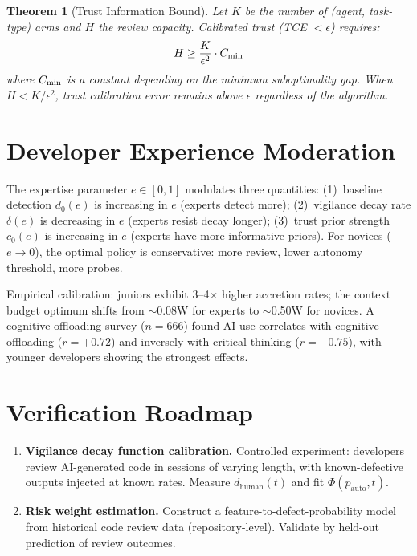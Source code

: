 \documentclass[11pt, a4paper, copyright]{googledeepmind}
\newtheorem{theorem}{Theorem}[section]
\begin{document}
\begin{appendices}
\begin{theorem}[Trust Information Bound]
\label{thm:info-bound}
Let $K$ be the number of (agent, task-type) arms and $H$ the review capacity. Calibrated trust (TCE $< \epsilon$) requires:
\begin{equation}
H \geq \frac{K}{\epsilon^2} \cdot C_{\textup{min}}
\end{equation}
where $C_{\textup{min}}$ is a constant depending on the minimum suboptimality gap. When $H < K/\epsilon^2$, trust calibration error remains above $\epsilon$ regardless of the algorithm.
\end{theorem}

\section{Developer Experience Moderation}
\label{app:expertise}

The expertise parameter $e \in [0,1]$ modulates three quantities: (1)~baseline detection $d_0(e)$ is increasing in $e$ (experts detect more); (2)~vigilance decay rate $\delta(e)$ is decreasing in $e$ (experts resist decay longer); (3)~trust prior strength $c_0(e)$ is increasing in $e$ (experts have more informative priors). For novices ($e \to 0$), the optimal policy is conservative: more review, lower autonomy threshold, more probes.

Empirical calibration: juniors exhibit 3--4$\times$ higher accretion rates; the context budget optimum shifts from $\sim$0.08W for experts to $\sim$0.50W for novices. A cognitive offloading survey ($n = 666$) found AI use correlates with cognitive offloading ($r = +0.72$) and inversely with critical thinking ($r = -0.75$), with younger developers showing the strongest effects.

\section{Verification Roadmap}
\label{app:verification}

\begin{enumerate}[leftmargin=*]
\item \textbf{Vigilance decay function calibration.} Controlled experiment: developers review AI-generated code in sessions of varying length, with known-defective outputs injected at known rates. Measure $d_{\text{human}}(t)$ and fit $\Phi(p_{\text{auto}}, t)$.

\item \textbf{Risk weight estimation.} Construct a feature-to-defect-probability model from historical code review data (repository-level). Validate by held-out prediction of review outcomes.


\end{enumerate}
\end{appendices}
\end{document}
